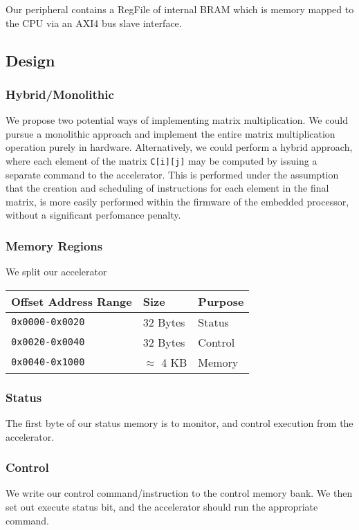 \documentclass[a4paper,8pt]{report}
\begin{document}
Our peripheral contains a RegFile of internal BRAM which is memory mapped to
the CPU via an AXI4 bus slave interface. 

\subsection{Design}
\subsubsection{Hybrid/Monolithic}
We propose two potential ways of implementing matrix multiplication. We could
pursue a monolithic approach and implement the entire matrix multiplication
operation purely in hardware. Alternatively, we could perform a hybrid approach,
where each element of the matrix \texttt{C[i][j]} may be computed by issuing a
separate command to the accelerator. This is performed under the assumption that the
creation and scheduling of instructions for each element in the final matrix, is
more easily performed within the firmware of the embedded processor, without a
significant perfomance penalty.

\subsubsection{Memory Regions}
We split our accelerator 
\begin{table}
  \centering
  \begin{tabular}{lll}
    \toprule
    Offset Address Range & Size & Purpose \\
    \midrule
    \texttt{0x0000-0x0020} & 32 Bytes & Status \\
    \texttt{0x0020-0x0040} & 32 Bytes & Control \\
    \texttt{0x0040-0x1000} & $\approx$ 4 KB & Memory \\
    \bottomrule
  \end{tabular}
\end{table}

\subsubsection{Status}
The first byte of our status memory is to monitor, and control execution from
the accelerator.

\subsubsection{Control}
We write our control command/instruction to the control memory bank. We then set out
execute status bit, and the accelerator should run the appropriate command.
\end{document}
